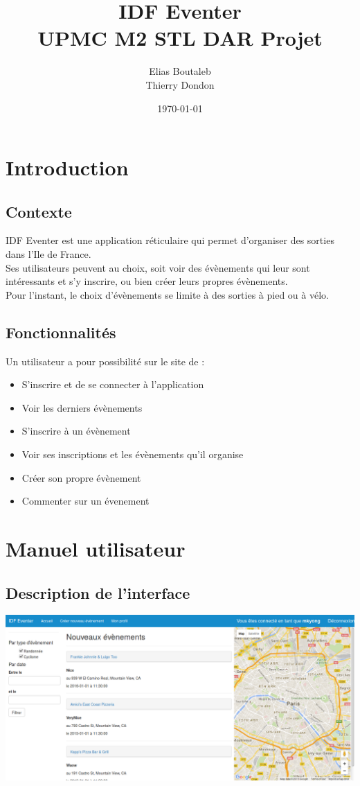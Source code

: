 \documentclass[11pt,a4paper,margin=0.5in]{report}
\title{IDF Eventer \\ UPMC M2 STL DAR Projet}
\author{Elias Boutaleb \\ Thierry Dondon}
\date{\today}
\begin{document}
\maketitle
\tableofcontents

\chapter{Introduction}

\section{Contexte}

IDF Eventer est une application réticulaire qui permet d'organiser des sorties dans l'Ile de France. \\
Ses utilisateurs peuvent au choix, soit voir des évènements qui leur sont intéressants et s'y inscrire, ou bien créer leurs propres évènements. \\
Pour l'instant, le choix d'évènements se limite à des sorties à pied ou à vélo.

\section{Fonctionnalités}

Un utilisateur a pour possibilité sur le site de :

\begin{itemize}
    \item S'inscrire et de se connecter à l'application
    \item Voir les derniers évènements
    \item S'inscrire à un évènement
    \item Voir ses inscriptions et les évènements qu'il organise
    \item Créer son propre évènement
    \item Commenter sur un évenement
\end{itemize}

\chapter{Manuel utilisateur}

\section{Description de l'interface}

\includegraphics[scale=0.33]{illus/main.png}
\end{document}
